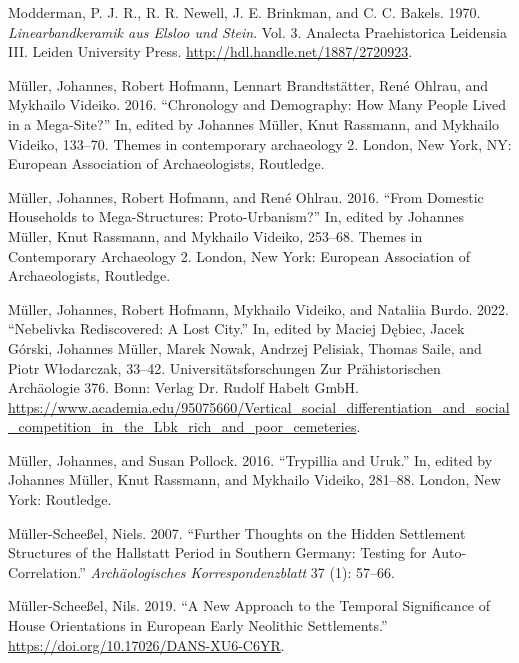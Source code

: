 \documentclass[
  12pt,
  a4paper, twoside]{book}
\newlength{\cslhangindent}
\newlength{\cslentryspacingunit} %
\newenvironment{CSLReferences}[2] %
 {%
  \setlength{\parindent}{0pt}
  \ifodd #1
  \let\oldpar\par
  \def\par{\hangindent=\cslhangindent\oldpar}
  \fi
  \setlength{\parskip}{#2\cslentryspacingunit}
 }%
 {}
\begin{document}
\begin{CSLReferences}{1}{0}
\leavevmode{}%
Modderman, P. J. R., R. R. Newell, J. E. Brinkman, and C. C. Bakels. 1970. \emph{Linearbandkeramik aus Elsloo und Stein}. Vol. 3. Analecta Praehistorica Leidensia III. Leiden University Press. \url{http://hdl.handle.net/1887/2720923}.

\leavevmode{}%
Müller, Johannes, Robert Hofmann, Lennart Brandtstätter, René Ohlrau, and Mykhailo Videiko. 2016. {``Chronology and Demography: How Many People Lived in a Mega-Site?''} In, edited by Johannes Müller, Knut Rassmann, and Mykhailo Videiko, 133--70. Themes in contemporary archaeology 2. London, New York, NY: European Association of Archaeologists, Routledge.

\leavevmode{}%
Müller, Johannes, Robert Hofmann, and René Ohlrau. 2016. {``From Domestic Households to Mega-Structures: Proto-Urbanism?''} In, edited by Johannes Müller, Knut Rassmann, and Mykhailo Videiko, 253--68. Themes in Contemporary Archaeology 2. London, New York: European Association of Archaeologists, Routledge.

\leavevmode{}%
Müller, Johannes, Robert Hofmann, Mykhailo Videiko, and Nataliia Burdo. 2022. {``Nebelivka {\textendash} Rediscovered: A Lost City.''} In, edited by Maciej Dębiec, Jacek Górski, Johannes Müller, Marek Nowak, Andrzej Pelisiak, Thomas Saile, and Piotr Włodarczak, 33--42. Universitätsforschungen Zur Prähistorischen Archäologie 376. Bonn: Verlag Dr. Rudolf Habelt GmbH. \url{https://www.academia.edu/95075660/Vertical_social_differentiation_and_social_competition_in_the_Lbk_rich_and_poor_cemeteries}.

\leavevmode{}%
Müller, Johannes, and Susan Pollock. 2016. {``Trypillia and Uruk.''} In, edited by Johannes Müller, Knut Rassmann, and Mykhailo Videiko, 281--88. London, New York: Routledge.

\leavevmode{}%
Müller-Scheeßel, Niels. 2007. {``Further Thoughts on the Hidden Settlement Structures of the Hallstatt Period in Southern Germany: Testing for Auto-Correlation.''} \emph{Archäologisches Korrespondenzblatt} 37 (1): 57--66.

\leavevmode{}%
Müller-Scheeßel, Nils. 2019. {``A New Approach to the Temporal Significance of House Orientations in European Early Neolithic Settlements.''} \url{https://doi.org/10.17026/DANS-XU6-C6YR}.


\end{CSLReferences}
\end{document}
